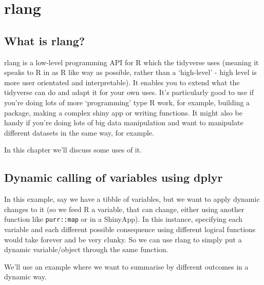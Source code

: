 \documentclass[]{book}
\begin{document}
\hypertarget{rlang}{%
\section{rlang}\label{rlang}}

\hypertarget{what-is-rlang}{%
\subsection{What is rlang?}\label{what-is-rlang}}

rlang is a low-level programming API for R which the tidyverse uses (meaning it speaks to R in as R like way as possible, rather than a `high-level' - high level is more user orientated and interpretable). It enables you to extend what the tidyverse can do and adapt it for your own uses. It's particularly good to use if you're doing lots of more `programming' type R work, for example, building a package, making a complex shiny app or writing functions. It might also be handy if you're doing lots of big data manipulation and want to manipulate different datasets in the same way, for example.

In this chapter we'll discuss some uses of it.

\hypertarget{dynamic-calling-of-variables-using-dplyr}{%
\subsection{Dynamic calling of variables using dplyr}\label{dynamic-calling-of-variables-using-dplyr}}

In this example, say we have a tibble of variables, but we want to apply dynamic changes to it (so we feed R a variable, that can change, either using another function like \texttt{purr::map} or in a ShinyApp). In this instance, specifying each variable and each different possible consequence using different logical functions would take forever and be very clunky. So we can use rlang to simply put a dynamic variable/object through the same function.

We'll use an example where we want to summarise by different outcomes in a dynamic way.
\end{document}
